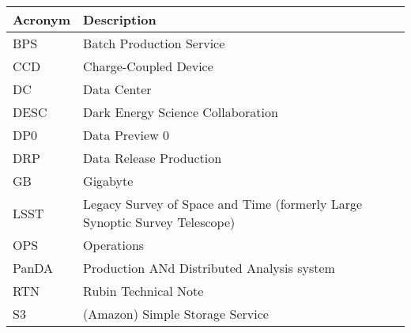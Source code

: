 \addtocounter{table}{-1}
\begin{longtable}{p{}p{}}\hline
\textbf{Acronym} & \textbf{Description}  \\\hline

BPS & Batch Production Service \\\hline
CCD & Charge-Coupled Device \\\hline
DC & Data Center \\\hline
DESC & Dark Energy Science Collaboration \\\hline
DP0 & Data Preview 0 \\\hline
DRP & Data Release Production \\\hline
GB & Gigabyte \\\hline
LSST & Legacy Survey of Space and Time (formerly Large Synoptic Survey Telescope) \\\hline
OPS & Operations \\\hline
PanDA &  Production ANd Distributed Analysis system \\\hline
RTN & Rubin Technical Note \\\hline
S3 & (Amazon) Simple Storage Service  \\\hline
\end{longtable}
